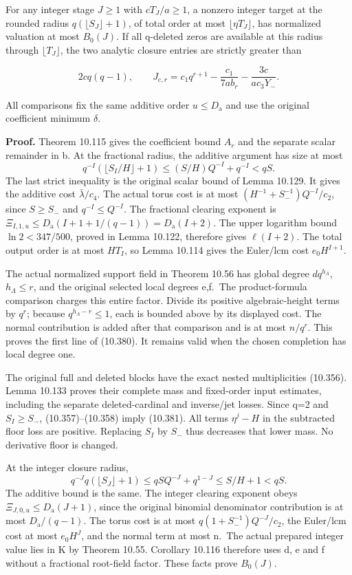 \documentclass[
  11pt,
  a4paper,
]{article}
\begin{document}
For any integer stage \(J\ge1\) with \(cT_J/a\ge1\), a nonzero integer
target at the rounded radius \(q(\lfloor S_J\rfloor+1)\), of total order
at most \(\lfloor\eta T_J\rfloor\), has normalized valuation at most
\(B_0(J)\). If all q-deleted zeros are available at this radius through
\(\lfloor T_J\rfloor\), the two analytic closure entries are strictly
greater than

\[
2cq(q-1),\qquad
J_{\mathrm c,r}=c_1q^{r+1}-\frac{c_1}{7ab_r}
-\frac{3c}{ac_3Y_-}.
\tag{10.382}
\]

All comparisons fix the same additive order \(u\le D_{\mathrm a}\) and
use the original coefficient minimum \(\delta\).

\textbf{Proof.} Theorem 10.115 gives the coefficient bound \(A_r\) and
the separate scalar remainder in b. At the fractional radius, the
additive argument has size at most \[
q^{-I}(\lfloor S_I/H\rfloor+1)
\le (S/H)Q^{-I}+q^{-I}<qS.
\] The last strict inequality is the original scalar bound of Lemma
10.129. It gives the additive cost \(\bar\lambda/c_4\). The actual torus
cost is at most \((H^{-1}+S_-^{-1})Q^{-I}/c_2\), since \(S\ge S_-\) and
\(q^{-I}\le Q^{-I}\). The fractional clearing exponent is
\(\Xi_{I,1,u}\le D_{\mathrm a}(I+1+1/(q-1))=D_{\mathrm a}(I+2)\). The
upper logarithm bound \(\ln2<347/500\), proved in Lemma 10.122,
therefore gives \(\ell(I+2)\). The total output order is at most
\(HT_I\), so Lemma 10.114 gives the Euler/lcm cost \(e_0H^{I+1}\).

The actual normalized support field in Theorem 10.56 has global degree
\(dq^{h_\Lambda}\), \(h_\Lambda\le r\), and the original selected local
degrees e,f.~The product-formula comparison charges this entire factor.
Divide its positive algebraic-height terms by \(q^r\); because
\(q^{h_\Lambda-r}\le1\), each is bounded above by its displayed cost.
The normal contribution is added after that comparison and is at most
\(n/q^r\). This proves the first line of (10.380). It remains valid when
the chosen completion has local degree one.

The original full and deleted blocks have the exact nested
multiplicities (10.356). Lemma 10.133 proves their complete mass and
fixed-order input estimates, including the separate deleted-cardinal and
inverse/jet losses. Since q=2 and \(S_I\ge S_-\), (10.357)--(10.358)
imply (10.381). All terms \(\eta^j-H\) in the subtracted floor loss are
positive. Replacing \(S_I\) by \(S_-\) thus decreases that lower mass.
No derivative floor is changed.

At the integer closure radius, \[
q^{-J}q(\lfloor S_J\rfloor+1)
\le qSQ^{-J}+q^{1-J}\le S/H+1<qS.
\] The additive bound is the same. The integer clearing exponent obeys
\(\Xi_{J,0,u}\le D_{\mathrm a}(J+1)\), since the original binomial
denominator contribution is at most \(D_{\mathrm a}/(q-1)\). The torus
cost is at most \(q(1+S_-^{-1})Q^{-J}/c_2\), the Euler/lcm cost at most
\(e_0H^J\), and the normal term at most n.~The actual prepared integer
value lies in K by Theorem 10.55. Corollary 10.116 therefore uses d, e
and f without a fractional root-field factor. These facts prove
\(B_0(J)\).
\end{document}
